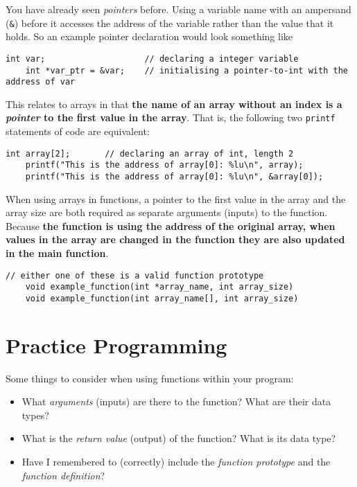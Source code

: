\documentclass{pass}
\begin{document}
You have already seen \textit{pointers} before. Using a variable name with an ampersand (\texttt{\&}) before it accesses the address of the variable rather than the value that it holds. So an example pointer declaration would look something like
\begin{lstlisting}[style=CStyle]
	int var;					// declaring a integer variable
	int *var_ptr = &var;	// initialising a pointer-to-int with the address of var
\end{lstlisting}

This relates to arrays in that \textbf{the name of an array without an index is a \textit{pointer} to the first value in the array}. That is, the following two \texttt{printf} statements of code are equivalent:
\begin{lstlisting}[style=CStyle]
	int array[2];		// declaring an array of int, length 2
	printf("This is the address of array[0]: %lu\n", array);
	printf("This is the address of array[0]: %lu\n", &array[0]);
\end{lstlisting}

When using arrays in functions, a pointer to the first value in the array and the array size are both required as separate arguments (inputs) to the function. Because \textbf{the function is using the address of the original array, when values in the array are changed in the function they are also updated in the main function}.

\begin{lstlisting}[style=CStyle]
	// either one of these is a valid function prototype
	void example_function(int *array_name, int array_size)	
	void example_function(int array_name[], int array_size)
\end{lstlisting}


\pagebreak

\section*{Practice Programming}
Some things to consider when using functions within your program:
\begin{itemize}
\item What \textit{arguments} (inputs) are there to the function? What are their data types?
\item What is the \textit{return value} (output) of the function? What is its data type?
\item Have I remembered to (correctly) include the \textit{function prototype} and the \textit{function definition}?
\end{itemize}
\end{document}
